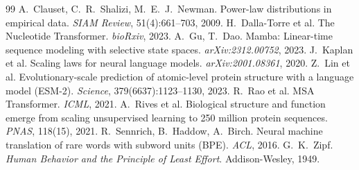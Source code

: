 \documentclass[11pt]{article}
\begin{document}
\begin{thebibliography}{99}
 A.~Clauset, C.~R.~Shalizi, M.~E.~J.~Newman.
\newblock Power-law distributions in empirical data. \emph{SIAM Review}, 51(4):661--703, 2009.
 H.~Dalla-Torre et al.
\newblock The Nucleotide Transformer. \emph{bioRxiv}, 2023.
 A.~Gu, T.~Dao.
\newblock Mamba: Linear-time sequence modeling with selective state spaces. \emph{arXiv:2312.00752}, 2023.
 J.~Kaplan et al.
\newblock Scaling laws for neural language models. \emph{arXiv:2001.08361}, 2020.
 Z.~Lin et al.
\newblock Evolutionary-scale prediction of atomic-level protein structure with a language model (ESM-2). \emph{Science}, 379(6637):1123--1130, 2023.
 R.~Rao et al.
\newblock MSA Transformer. \emph{ICML}, 2021.
 A.~Rives et al.
\newblock Biological structure and function emerge from scaling unsupervised learning to 250 million protein sequences. \emph{PNAS}, 118(15), 2021.
 R.~Sennrich, B.~Haddow, A.~Birch.
\newblock Neural machine translation of rare words with subword units (BPE). \emph{ACL}, 2016.
 G.~K.~Zipf.
\newblock \emph{Human Behavior and the Principle of Least Effort}. Addison-Wesley, 1949.
\end{thebibliography}
\end{document}
